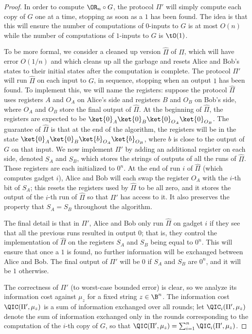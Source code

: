 \begin{proof}
In order to compute $\OR_n\circ G$, the
protocol $\Pi'$ will simply compute each copy of $G$ one at a time,
stopping as soon as a $1$ has been found. The idea is that this
will ensure the number of computations of $0$-inputs to $G$
is at most $O(n)$ while the number of computations of
$1$-inputs to $G$ is $\tO(1)$.

To be more formal, we consider a cleaned up version
$\hat{\Pi}$ of $\Pi$, which will have error $O(1/n)$
and which cleans up all the garbage and resets Alice and Bob's
states to their initial states after the computation is complete.
The protocol $\Pi'$ will run $\hat{\Pi}$ on each input to $G$,
in sequence, stopping when an output $1$ has been found.
To implement this, we will name the registers:
suppose the protocol $\hat{\Pi}$ uses registers $A$ and $O_A$
on Alice's side and registers $B$ and $O_B$ on Bob's side,
where $O_A$ and $O_B$ store the final output of $\hat{\Pi}$.
At the beginning of $\hat{\Pi}$, the registers are expected
to be $\ket{0}_A\ket{0}_B\ket{0}_{O_A}\ket{0}_{O_B}$.
The guarantee of $\hat{\Pi}$ is that at the end of the algorithm,
the registers will be in the state
$\ket{0}_A\ket{0}_B\ket{b}_{O_A}\ket{b}_{O_B}$,
where $b$ is close to the output of $G$ on that input.
We now implement $\Pi'$ by adding an additional register
on each side, denoted $S_A$ and $S_B$, which stores the strings
of outputs of all the runs of $\hat{\Pi}$. These
registers are each initialized to $0^n$. At the
end of run $i$ of $\hat{\Pi}$ (which computes gadget $i$),
Alice and Bob will each swap the register $O_A$ with
the $i$-th bit of $S_A$; this resets the registers
used by $\hat{\Pi}$ to be all zero, and it stores the output
of the $i$-th run of $\hat{\Pi}$ so that $\Pi'$ has access
to it. It also preserves the property that $S_A=S_B$ throughout
the algorithm.

The final detail is that in $\Pi'$, Alice and Bob only run
$\hat{\Pi}$ on gadget $i$ if they see that all the previous runs
resulted in output $0$; that is, they control the implementation
of $\hat{\Pi}$ on the registers $S_A$ and $S_B$ being equal to $0^n$.
This will ensure that once a $1$ is found, no further information
will be exchanged between Alice and Bob. The final output
of $\Pi'$ will be $0$ if $S_A$ and $S_B$ are $0^n$, and it will be
$1$ otherwise.

The correctness of $\Pi'$ (to worst-case bounded error) is clear,
so we analyze its information cost against $\mu_z$ for a
fixed string $z\in\B^n$. The information cost $\QIC(\Pi',\mu_z)$
is a sum of information exchanged over all rounds;
let $\QIC_i(\Pi',\mu_z)$ denote the sum of information
exchanged only in the rounds corresponding to the computation
of the $i$-th copy of $G$, so that
$\QIC(\Pi',\mu_z)=\sum_{i=1}^n\QIC_i(\Pi',\mu_z)$.


\end{proof}

